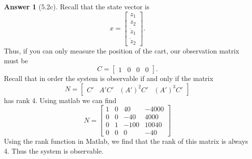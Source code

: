 \documentclass{article}
\theoremstyle{definition}
\newtheorem*{ans}{Answer}
\begin{document}
    \begin{ans}[5.2c]
        Recall that the state vector is
        \begin{equation*}
            x = 
            \begin{bmatrix}
                z_1 \\
                z_2 \\
                \dot z_1 \\
                \dot z_2
            \end{bmatrix}
            .
        \end{equation*}
        Thus, if you can only measure the position of the 
        cart, our observation matrix must be
        \begin{equation*}
            C = 
            \begin{bmatrix}
                1 & 0 & 0 & 0
            \end{bmatrix}
            .
        \end{equation*}
        Recall that in order the system is observable if and only if 
        the matrix 
        \begin{equation*}
            N = 
            \begin{bmatrix}
                C' & A' C' & (A')^2 C' & (A')^3 C'
            \end{bmatrix}
        \end{equation*}
        has rank 4.
        Using matlab we can find
        \begin{equation*}
            N = 
            \begin{bmatrix}
                1    &      0    &     40   &   -4000 \\
                0    &      0    &    -40   &    4000 \\
                0    &      1    &   -100   &   10040 \\
                0    &      0    &      0   &     -40
            \end{bmatrix}
        \end{equation*}
        Using the rank function in Matlab, we find that the rank of
        this matrix is always 4. 
        Thus the system is observable.

    \end{ans}
\end{document}
